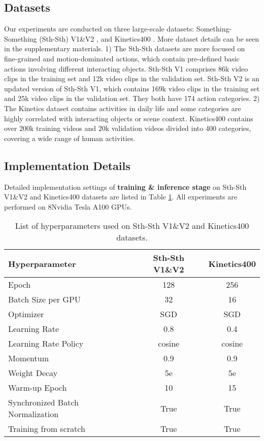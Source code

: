 \documentclass{article} \usepackage{iclr2023_conference,times}
\begin{document}
\subsection{Datasets}
Our experiments are conducted on three large-scale datasets: Something-Something (Sth-Sth) V1\&V2 \citep{goyal2017something}, and Kinetics400 \citep{kay2017kinetics}. More dataset details can be seen in the supplementary materials.
1) The Sth-Sth datasets are more focused on fine-grained and motion-dominated actions, which contain pre-defined basic actions involving different interacting objects. 
Sth-Sth V1 comprises 86k video clips in the training set and 12k video clips in the validation set. Sth-Sth V2 is an updated version of Sth-Sth V1, which contains 169k video clips in the training set and 25k video clips in the validation set. They both have 174 action categories.
2) The Kinetics dataset contains activities in daily life and some categories are highly correlated with interacting objects or scene context.
Kinetics400 contains over 200k training videos and 20k validation videos divided into 400 categories, covering a wide range of human activities.

\subsection{Implementation Details}
Detailed implementation settings of \textbf{training \& inference stage} on Sth-Sth V1\&V2 and Kinetics400 datasets are listed in Table \ref{tab:implementation}.
All experiments are performed on 8Nvidia Tesla A100 GPUs.

\begin{table}[ht]
    \centering
    \begin{tabular}{l c c}
    \toprule
    Hyperparameter & Sth-Sth V1\&V2 & Kinetics400 \\
    \midrule
       Epoch  & 128 & 256 \\
    Batch Size per GPU & 32 & 16\\
    Optimizer     & SGD & SGD\\
    Learning Rate & 0.8 & 0.4 \\
    Learning Rate Policy & cosine & cosine\\
    Momentum & 0.9 & 0.9 \\
    Weight Decay & 5e & 5e\\
    Warm-up Epoch & 10 & 15 \\
    Synchronized Batch Normalization & True & True \\
    Training from scratch & True & True \\
    \bottomrule
    \end{tabular}
    \caption{List of hyperparameters used on Sth-Sth V1\&V2 and Kinetics400 datasets.}
    \label{tab:implementation}
\end{table}
\end{document}
